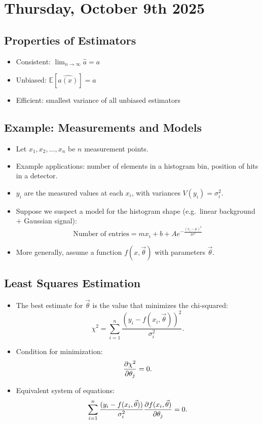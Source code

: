 \section{Thursday, October 9th 2025}

\subsection{Properties of Estimators}
\begin{itemize}
      \item Consistent: $\lim_{n \rightarrow \infty} \hat{a} = a$
      \item Unbiased: $\mathbb{E}[\hat{a(x)}] = a$
      \item Efficient: smallest variance of all unbiased estimators
\end{itemize}

\subsection{Example: Measurements and Models}
\begin{itemize}
      \item Let $x_1, x_2, \ldots, x_n$ be $n$ measurement points.
      \item Example applications: number of elements in a histogram bin, position of hits in a detector.
      \item $y_i$ are the measured values at each $x_i$, with variances $V(y_i) = \sigma_i^2$.
      \item Suppose we suspect a model for the histogram shape (e.g.\ linear background $+$ Gaussian signal):
            \[
                  \text{Number of entries} = m x_i + b + A e^{-\frac{(x_i - \mu)^2}{2\sigma^2}}
            \]
      \item More generally, assume a function $f(x, \vec{\theta})$ with parameters $\vec{\theta}$.
\end{itemize}

\subsection{Least Squares Estimation}
\begin{itemize}
      \item The best estimate for $\vec{\theta}$ is the value that minimizes the chi-squared:
            \[
                  \chi^2 = \sum_{i=1}^{n} \frac{(y_i - f(x_i, \vec{\theta}))^2}{\sigma_i^2}.
            \]
      \item Condition for minimization:
            \[
                  \pdv{\chi^2}{\theta_j} = 0.
            \]
      \item Equivalent system of equations:
            \[
                  \sum_{i=1}^{n} \frac{(y_i - f(x_i, \vec{\theta}))}{\sigma_i^2}
                  \pdv{f(x_i, \vec{\theta})}{\theta_j} = 0.
            \]
\end{itemize}


